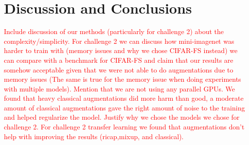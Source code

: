 \documentclass[a4paper,11pt]{article}
\begin{document}
\section{Discussion and Conclusions}
\textcolor{red}{ Include discussion of our methods (particularly for challenge 2) about the complexity/simplicity. For challenge 2 we can discuss how mini-imagenet was harder to train with (memory issues and why we chose CIFAR-FS instead) we can compare with a benchmark for CIFAR-FS and claim that our results are somehow acceptable given that we were not able to do augmentations due to memory issues (The same is true for the memory issue when doing experiments with multiple models). Mention that we are not using any parallel GPUs. We found that heavy classical augmentations did more harm than good, a moderate amount of classical augmentations gave the right amount of noise to the training and helped regularize the model. Justify why we chose the models we chose for challenge 2. For challenge 2 transfer learning we found that augmentations don't help with improving the results (ricap,mixup, and classical). }


\end{document}
